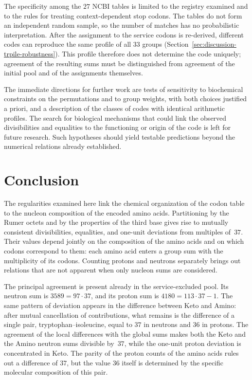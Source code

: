 \documentclass[11pt,a4paper]{article}
\renewcommand{\_}{\origunderscore\allowbreak}
\begin{document}
The specificity among the $27$ NCBI tables is limited to the
registry examined and to the rules for treating context-dependent
stop codons. The tables do not form an independent random
sample, so the number of matches has no probabilistic
interpretation. After the assignment to the service codons is
re-derived, different codes can reproduce the same profile of
all $33$ groups (Section~\ref{sec:discussion-trpile-robustness}).
This profile therefore does not determine the code uniquely;
agreement of the resulting sums must be distinguished from
agreement of the initial pool and of the assignments themselves.

The immediate directions for further work are tests of
sensitivity to biochemical constraints on the permutations and
to group weights, with both choices justified a priori, and a
description of the classes of codes with identical arithmetic
profiles. The search
for biological mechanisms that could link the observed
divisibilities and equalities to the functioning or origin of
the code is left for future research. Such hypotheses should
yield testable predictions beyond the numerical relations
already established.

\section{Conclusion}
\label{sec:conclusion}

The regularities examined here link the chemical organization
of the codon table to the nucleon composition of the encoded
amino acids. Partitioning by the Rumer octets and by the
properties of the third base gives rise to mutually consistent
divisibilities, equalities, and one-unit deviations from
multiples of~$37$. Their values depend jointly on the
composition of the amino acids and on which codons correspond
to them: each amino acid enters a group sum with the
multiplicity of its codons. Counting protons and neutrons
separately brings out relations that are not apparent when
only nucleon sums are considered.

The principal agreement is present already in the
service-excluded pool. Its neutron sum is $3589=97\cdot37$,
and its proton sum is $4180=113\cdot37-1$. The same pattern
of deviation appears in the difference between Keto and Amino:
after mutual cancellation of contributions, what remains is
the difference of a single pair, tryptophan--isoleucine, equal
to $37$ in neutrons and $36$ in protons. The agreement of the
local differences with the global sums makes both the Keto and
the Amino neutron sums divisible by~$37$, while the one-unit
proton deviation is concentrated in Keto. The parity of the
proton counts of the amino acids rules out a difference of
$37$, but the value $36$ itself is determined by the specific
molecular composition of this pair.
\end{document}
